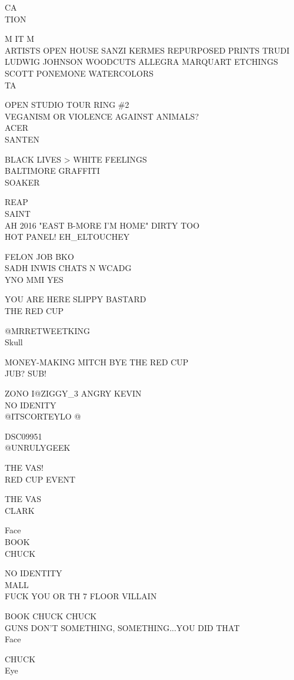 \documentclass[10pt,letterpaper]{article}
\begin{document}
CA\\
TION

M IT M\\
ARTISTS OPEN HOUSE SANZI KERMES REPURPOSED PRINTS TRUDI LUDWIG JOHNSON WOODCUTS ALLEGRA MARQUART ETCHINGS SCOTT PONEMONE WATERCOLORS\\
TA

OPEN STUDIO TOUR RING \#2\\
VEGANISM OR VIOLENCE AGAINST ANIMALS?\\
ACER\\
SANTEN

BLACK LIVES > WHITE FEELINGS\\
BALTIMORE GRAFFITI\\
SOAKER

REAP\\
SAINT\\
AH 2016 "EAST B{-}MORE I'M HOME"  DIRTY TOO\\
HOT PANEL! EH\_ELTOUCHEY

FELON JOB BKO\\
SADH INWIS CHATS N WCADG\\
YNO MMI YES

YOU ARE HERE SLIPPY BASTARD\\
THE RED CUP

@MRRETWEETKING\\
Skull

MONEY{-}MAKING MITCH BYE THE RED CUP\\
JUB? SUB!

ZONO I@ZIGGY\_3 ANGRY KEVIN\\
NO IDENITY\\
@ITSCORTEYLO @

DSC09951\\
@UNRULYGEEK

THE VAS!\\
RED CUP EVENT

THE VAS\\
CLARK

Face\\
BOOK\\
CHUCK

NO IDENTITY\\
MALL\\
FUCK YOU OR TH 7 FLOOR VILLAIN

BOOK CHUCK CHUCK\\
GUNS DON'T SOMETHING, SOMETHING...YOU DID THAT\\
Face

CHUCK\\
Eye
\end{document}

